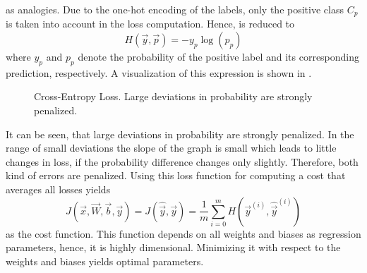 as analogies.
Due to the one-hot encoding of the labels, only the positive class $C_p$ is taken into account in the loss computation.
Hence,  is reduced to
\begin{equation}
	\label{eq:cross-entropy-loss-compact}
	H(\vec{y}, \vec{p}) = - y_p \log (p_p)
\end{equation}
where $y_p$ and $p_p$ denote the probability of the positive label and its corresponding prediction, respectively.
A visualization of this expression is shown in .
\begin{figure}
	\setlength{}
	\setlength{}
	\centering
	
	\caption[Cross-Entropy Loss]{Cross-Entropy Loss. Large deviations in probability are strongly penalized.}
	\label{fig:cross-entropy}
\end{figure}
It can be seen, that large deviations in probability are strongly penalized.
In the range of small deviations the slope of the graph is small which leads to little changes in loss, if the probability difference changes only slightly.
Therefore, both kind of errors are penalized.
Using this loss function for computing a cost that averages all losses yields
\begin{equation}
	\label{eq:cross-entropy-cost}
	J(\vec{x}, \vec{W}, \vec{b}, \vec{y}) = J(\hat{\vec{y}}, \vec{y}) = \frac{1}{m} \sum_{i=0}^{m} H(\vec{y}^{(i)}, \hat{\vec{y}}^{(i)})
\end{equation}
as the cost function.
This function depends on all weights and biases as regression parameters, hence, it is highly dimensional.
Minimizing it with respect to the weights and biases yields optimal parameters.